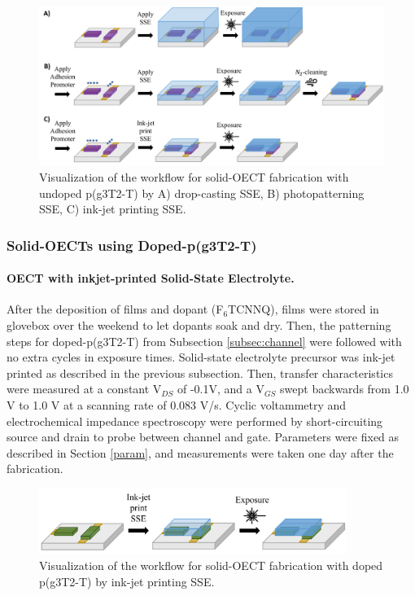 \begin{figure}[!ht]
	\centering
	\includegraphics[width=\textwidth]{Images/pdf/undoped-sse.pdf}
	\caption[Solid-OECT fabrication with undoped p(g3T2-T)]{Visualization of the workflow for solid-OECT fabrication with undoped p(g3T2-T) by A) drop-casting SSE, B) photopatterning SSE, C) ink-jet printing SSE.}
	\label{fig:undopedsse}
\end{figure}

\subsubsection{Solid-OECTs using Doped-p(g3T2-T)}

\paragraph{OECT with inkjet-printed Solid-State Electrolyte.}After the deposition of films and dopant (F$_{6}$TCNNQ), films were stored in glovebox over the weekend to let dopants soak and dry. Then, the patterning steps for doped-p(g3T2-T) from Subsection \ref{subsec:channel} were followed with no extra cycles in exposure times. Solid-state electrolyte precursor was ink-jet printed as described in the previous subsection. Then, transfer characteristics were measured at a constant V$_{DS}$ of -0.1V, and  a  V$_{GS}$ swept backwards from 1.0 V to 1.0 V at a scanning rate of 0.083 V/s. Cyclic voltammetry and electrochemical impedance spectroscopy were performed by short-circuiting source and drain to probe between channel and gate. Parameters were fixed as described in Section \ref{param}, and measurements were taken one day after the fabrication.

\begin{figure}[!ht]
	\centering
	\includegraphics[width=10cm]{Images/pdf/doped-sse.pdf}
	\caption[Solid-OECT fabrication with doped p(g3T2-T)]{Visualization of the workflow for solid-OECT fabrication with doped p(g3T2-T) by ink-jet printing SSE.}
	\label{fig:dopedsse}
\end{figure}

